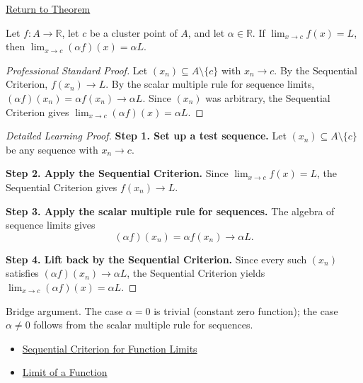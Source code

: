 \newpage
{}
\label{prf:limit-scalar-multiple}

\begin{remark*}[Return]
\hyperref[thm:limit-scalar-multiple]{Return to Theorem}
\end{remark*}

\begin{theorem*}
Let $f : A \to \mathbb{R}$, let $c$ be a cluster point of $A$, and let
$\alpha \in \mathbb{R}$. If $\lim_{x\to c}f(x)=L$, then
$\lim_{x\to c}(\alpha f)(x) = \alpha L$.
\end{theorem*}

\begin{proof}[Professional Standard Proof]
\LRAProofBodyStart
Let $(x_n) \subseteq A \setminus \{c\}$ with $x_n \to c$.
By the Sequential Criterion, $f(x_n) \to L$.
By the scalar multiple rule for sequence limits, $(\alpha f)(x_n) = \alpha f(x_n) \to \alpha L$.
Since $(x_n)$ was arbitrary, the Sequential Criterion gives
$\lim_{x\to c}(\alpha f)(x) = \alpha L$.
\end{proof}

\begin{proof}[Detailed Learning Proof]
\LRAProofBodyStart
\textbf{Step 1. Set up a test sequence.}
Let $(x_n) \subseteq A \setminus \{c\}$ be any sequence with $x_n \to c$.

\textbf{Step 2. Apply the Sequential Criterion.}
Since $\lim_{x\to c}f(x)=L$, the Sequential Criterion gives $f(x_n) \to L$.

\textbf{Step 3. Apply the scalar multiple rule for sequences.}
The algebra of sequence limits gives
\[
  (\alpha f)(x_n) = \alpha f(x_n) \to \alpha L.
\]

\textbf{Step 4. Lift back by the Sequential Criterion.}
Since every such $(x_n)$ satisfies $(\alpha f)(x_n) \to \alpha L$, the
Sequential Criterion yields $\lim_{x\to c}(\alpha f)(x) = \alpha L$.
\end{proof}

\begin{remark*}
Bridge argument. The case $\alpha = 0$ is trivial (constant zero function);
the case $\alpha \neq 0$ follows from the scalar multiple rule for sequences.
\end{remark*}

\begin{remark*}[Dependencies]
\begin{itemize}
  \item \hyperref[prop:sequential-criterion-limits]{Sequential Criterion for Function Limits}
  \item \hyperref[def:limit-function]{Limit of a Function}
\end{itemize}
\end{remark*}

\clearpage
